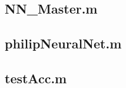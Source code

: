 \documentclass[12pt]{article}
\begin{document}
	\subsection*{NN\_Master.m}
	
	\subsection*{philipNeuralNet.m}
	
	
	\subsection*{testAcc.m}
	
	
	
	
		
	
\end{document}

